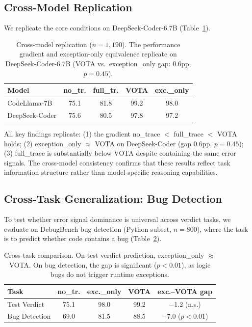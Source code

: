 \documentclass[11pt,a4paper]{article}
\begin{document}
\subsection{Cross-Model Replication}
\label{sec:cross_model}

We replicate the core conditions on DeepSeek-Coder-6.7B (Table~\ref{tab:cross_model}).

\begin{table}[t]
\centering
\small
\begin{tabular}{lcccc}
\toprule
\textbf{Model} & \textbf{no\_tr.} & \textbf{full\_tr.} & \textbf{VOTA} & \textbf{exc.\_only} \\
\midrule
CodeLlama-7B & 75.1 & 81.8 & 99.2 & 98.0 \\
DeepSeek-Coder & 75.6 & 80.5 & 97.8 & 97.2 \\
\bottomrule
\end{tabular}
\caption{Cross-model replication ($n=1{,}190$). The performance gradient and exception-only equivalence replicate on DeepSeek-Coder-6.7B (VOTA vs.\ exception\_only gap: 0.6pp, $p=0.45$).}
\label{tab:cross_model}
\end{table}

All key findings replicate:
(1) the gradient no\_trace $<$ full\_trace $<$ VOTA holds;
(2) exception\_only $\approx$ VOTA on DeepSeek-Coder (gap 0.6pp, $p=0.45$);
(3) full\_trace is substantially below VOTA despite containing the same error signals.
The cross-model consistency confirms that these results reflect task information structure rather than model-specific reasoning capabilities.

\subsection{Cross-Task Generalization: Bug Detection}
\label{sec:cross_task}

To test whether error signal dominance is universal across verdict tasks, we evaluate on DebugBench bug detection (Python subset, $n=800$), where the task is to predict whether code contains a bug (Table~\ref{tab:cross_task}).

\begin{table}[t]
\centering
\small
\begin{tabular}{lcccc}
\toprule
\textbf{Task} & \textbf{no\_tr.} & \textbf{exc.\_only} & \textbf{VOTA} & \textbf{exc.--VOTA gap} \\
\midrule
Test Verdict & 75.1 & 98.0 & 99.2 & $-$1.2 (n.s.) \\
Bug Detection & 69.0 & 81.5 & 88.5 & $-$7.0 ($p{<}$0.01) \\
\bottomrule
\end{tabular}
\caption{Cross-task comparison. On test verdict prediction, exception\_only $\approx$ VOTA. On bug detection, the gap is significant ($p<0.01$), as logic bugs do not trigger runtime exceptions.}
\label{tab:cross_task}
\end{table}
\end{document}
